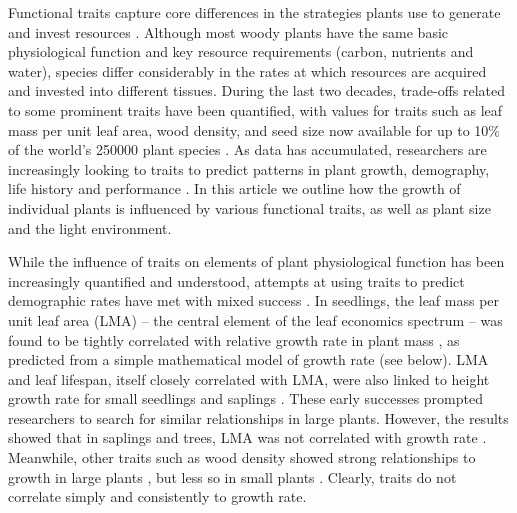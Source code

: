 \documentclass[a4paper,11pt]{article}
\begin{document}

Functional traits capture core differences in the strategies plants use to generate and invest resources \citep{Westoby-2002, Wright-2004, Chave-2009}. Although most woody plants have the same basic physiological function and key resource requirements (carbon, nutrients and water), species differ considerably in the rates at which resources are acquired and invested into different tissues. During the last two decades, trade-offs related to some prominent traits have been quantified, with values for traits such as leaf mass per unit leaf area, wood density, and seed size now available for up to 10\% of the world's 250000 plant species \citep{Cornwell-2014}. As data has accumulated, researchers are increasingly looking to traits to predict patterns in plant growth, demography, life history and performance \citep{Poorter-2008, Wright-2010, VanKleunen-2010, Adler-2014}. In this article we outline how the growth of individual plants is influenced by various functional traits, as well as plant size and the light environment.

While the influence of traits on elements of plant physiological function has been increasingly quantified and understood, attempts at using traits to predict demographic rates have met with mixed success \citep{Poorter-2006, Poorter-2008,Wright-2010,Herault-2011,Paine-2015}. In seedlings, the leaf mass per unit leaf area (LMA) -- the central element of the leaf economics spectrum \citep{Wright-2004} -- was found to be tightly correlated with relative growth rate in plant mass \citep{Lambers-1992, Cornelissen-1996, Wright-2000}, as predicted from a simple mathematical model of growth rate (see below). LMA and leaf lifespan, itself closely correlated with LMA, were also linked to height growth rate for small seedlings and saplings \citep{Reich-1992, Poorter-2006}. These early successes prompted researchers to search for similar relationships in large plants. However, the results showed that in saplings and trees, LMA was not correlated with growth rate \citep{Poorter-2008, Wright-2010, Herault-2011, Paine-2015}. Meanwhile, other traits such as wood density showed strong relationships to growth in large plants \citep{Wright-2010,Herault-2011}, but less so in small plants \citep{Castro-1998}. Clearly, traits do not correlate simply and consistently to growth rate.
\end{document}
